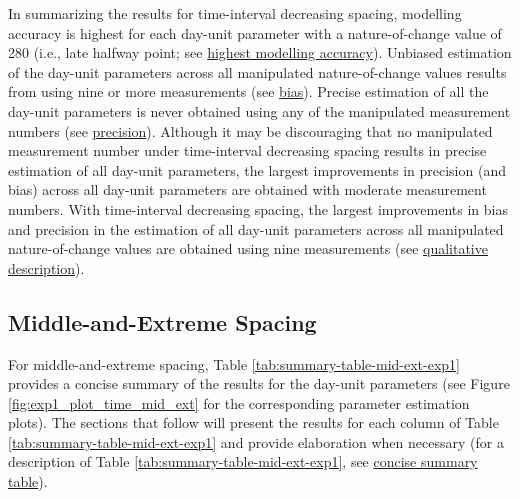 \documentclass[
12pt, %
twoside,
english]{guelphthesis}
\theoremstyle{definition}
\theoremstyle{definition}
\theoremstyle{definition}
\theoremstyle{definition}
\theoremstyle{remark}
\begin{document}
In summarizing the results for time-interval decreasing spacing, modelling accuracy is highest for each day-unit parameter with a nature-of-change value of 280 (i.e., late halfway point; see \protect\hyperlink{nature-change-time-dec-exp1}{highest modelling accuracy}). Unbiased estimation of the day-unit parameters across all manipulated nature-of-change values results from using nine or more measurements (see \protect\hyperlink{bias-time-dec-exp1}{bias}). Precise estimation of all the day-unit parameters is never obtained using any of the manipulated measurement numbers (see \protect\hyperlink{precision-time-dec-exp1}{precision}). Although it may be discouraging that no manipulated measurement number under time-interval decreasing spacing results in precise estimation of all day-unit parameters, the largest improvements in precision (and bias) across all day-unit parameters are obtained with moderate measurement numbers. With time-interval decreasing spacing, the largest improvements in bias and precision in the estimation of all day-unit parameters across all manipulated nature-of-change values are obtained using nine measurements (see \protect\hyperlink{qualitative-time-inc-exp1}{qualitative description}).

\hypertarget{middle-and-extreme-spacing}{%
\subsection{Middle-and-Extreme Spacing}\label{middle-and-extreme-spacing}}

For middle-and-extreme spacing, Table \ref{tab:summary-table-mid-ext-exp1} provides a concise summary of the results for the day-unit parameters (see Figure \ref{fig:exp1_plot_time_mid_ext} for the corresponding parameter estimation plots). The sections that follow will present the results for each column of Table \ref{tab:summary-table-mid-ext-exp1} and provide elaboration when necessary (for a description of Table \ref{tab:summary-table-mid-ext-exp1}, see \protect\hyperlink{concise-tab}{concise summary table}).
\end{document}
